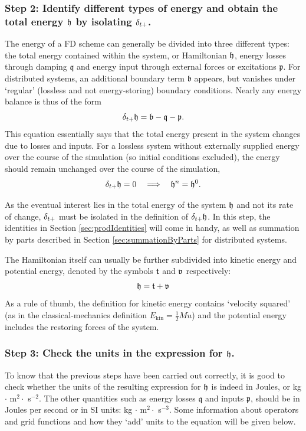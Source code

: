{{\subsubsection{Step 2: Identify different types of energy and obtain the total energy $\mathfrak{h}$ by isolating $\delta_{t+}$.}
The energy of a FD scheme can generally be divided into three different types: the total energy contained within the system, or Hamiltonian $\mathfrak{h}$, energy losses through damping $\mathfrak{q}$ and energy input through external forces or excitations $\mathfrak{p}$. For distributed systems, an additional boundary term $\mathfrak{b}$ appears, but vanishes under `regular' (lossless and not energy-storing) boundary conditions. Nearly any energy balance is thus of the form 
\begin{equation}\label{eq:energyForm}
    \delta_{t+} \mathfrak{h} = \mathfrak{b}-\mathfrak{q} - \mathfrak{p}.
\end{equation}
This equation essentially says that the total energy present in the system changes due to losses and inputs. For a lossless system without externally supplied energy over the course of the simulation (so initial conditions excluded), the energy should remain unchanged over the course of the simulation, 
\begin{equation}\label{eq:unchangedEnergy}
    \delta_{t+} \mathfrak{h} = 0 \quad \Longrightarrow \quad \mathfrak{h}^n = \mathfrak{h}^0.
\end{equation}

As the eventual interest lies in the total energy of the system $\mathfrak{h}$ and not its rate of change, $\delta_{t+}$ must be isolated in the definition of $\delta_{t+} \mathfrak{h}$. In this step, the identities in Section \ref{sec:prodIdentities} will come in handy, as well as summation by parts described in Section \ref{sec:summationByParts} for distributed systems.
 
The Hamiltonian itself can usually be further subdivided into kinetic energy and potential energy, denoted by the symbols $\mathfrak{t}$ and $\mathfrak{v}$ respectively:
\begin{equation}
    \mathfrak{h} = \mathfrak{t} + \mathfrak{v}
\end{equation}
As a rule of thumb, the definition for kinetic energy contains `velocity squared' (as in the classical-mechanics definition $E_\text{kin}=\tfrac{1}{2}M\dot u$) and the potential energy includes the restoring forces of the system. 

\subsubsection{Step 3: Check the units in the expression for $\mathfrak{h}$.}
To know that the previous steps have been carried out correctly, it is good to check whether the units of the resulting expression for $\mathfrak{h}$ is indeed in Joules, or kg $\cdot$ m$^2 \cdot $ s$^{-2}$. The other quantities such as energy losses $\mathfrak{q}$ and inputs $\mathfrak{p}$, should be in Joules per second or in SI units: kg $\cdot$ m$^2 \cdot $ s$^{-3}$. Some information about operators and grid functions and how they `add' units to the equation will be given below.

}}
